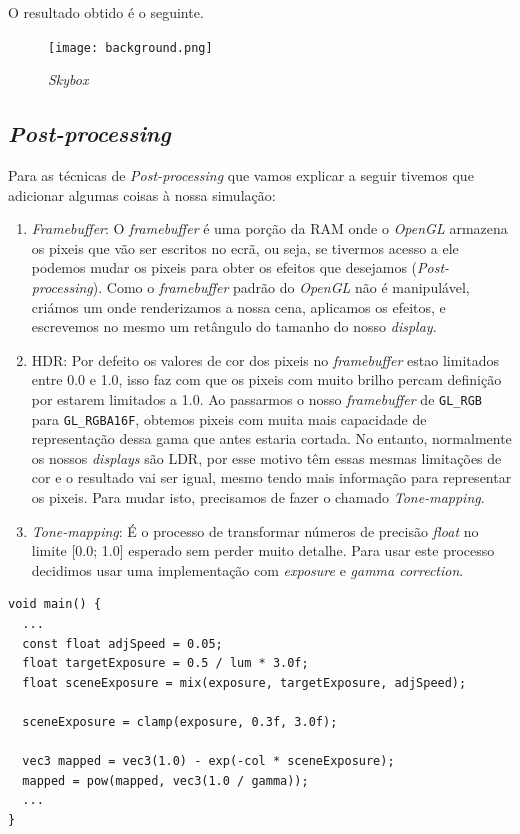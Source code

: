 \noindent
O resultado obtido é o seguinte.

\enlargethispage{1in}

\begin{figure}[H]
    \centering
    \texttt{[image: background.png]}
    \caption{\textit{Skybox}}
\end{figure}

\subsection{\textit{Post-processing}}

Para as técnicas de \textit{Post-processing} que vamos explicar a seguir tivemos que adicionar algumas coisas à nossa simulação:
\begin{enumerate}
    \item \textit{Framebuffer}: O \textit{framebuffer} é uma porção da \ac{RAM} onde o \textit{OpenGL} armazena os pixeis que vão ser escritos no ecrã, ou seja, se tivermos acesso a ele podemos mudar os pixeis para obter os efeitos que desejamos (\textit{Post-processing}). Como o \textit{framebuffer} padrão do \textit{OpenGL} não é manipulável, criámos um onde renderizamos a nossa cena, aplicamos os efeitos, e escrevemos no mesmo um retângulo do tamanho do nosso \textit{display}.
    
    \item  \ac{HDR}: Por defeito os valores de cor dos pixeis no \textit{framebuffer} estao limitados entre 0.0 e 1.0, isso faz com que os pixeis com muito brilho percam definição por estarem limitados a 1.0. Ao passarmos o nosso \textit{framebuffer} de \texttt{GL\_RGB} para \texttt{GL\_RGBA16F}, obtemos pixeis com muita mais capacidade de representação dessa gama que antes estaria cortada. 
    No entanto, normalmente os nossos \textit{displays} são \ac{LDR}, por esse motivo têm essas mesmas limitações de cor e o resultado vai ser igual, mesmo tendo mais informação para representar os pixeis. Para mudar isto, precisamos de fazer o chamado \textit{Tone-mapping}.

    \item \textit{Tone-mapping}: É o processo de transformar números de precisão \textit{float} no limite [0.0; 1.0] esperado sem perder muito detalhe. Para usar este processo decidimos usar uma implementação com \textit{exposure} e \textit{gamma correction}.
\end{enumerate}

\begin{lstlisting}[style=Cpp, caption=\textit{Fragment Shader} do \textit{framebuffer} para a \textit{exposure}]
void main() {
  ...
  const float adjSpeed = 0.05;
  float targetExposure = 0.5 / lum * 3.0f; 
  float sceneExposure = mix(exposure, targetExposure, adjSpeed);

  sceneExposure = clamp(exposure, 0.3f, 3.0f);

  vec3 mapped = vec3(1.0) - exp(-col * sceneExposure);
  mapped = pow(mapped, vec3(1.0 / gamma));
  ...
}
\end{lstlisting}

